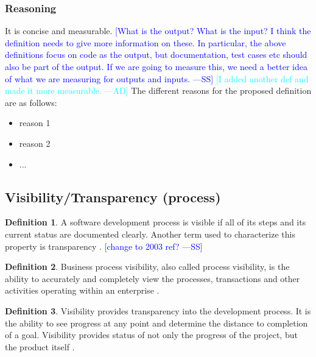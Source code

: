 \documentclass[letterpaper, cleveref]{lipics-v2019}
\newcommand{\authornote}[3]{\textcolor{#1}{[#3 ---#2]}}
\newcommand{\authornote}[3]{}
\newcommand{\wss}[1]{\authornote{blue}{SS}{#1}} %
\newcommand{\ad}[1]{\authornote{cyan}{AD}{#1}} %
\newcommand{\notdone}[1]{\textcolor{red}{#1}}
\theoremstyle{definition}
\newtheorem{defn}{Definition}
\begin{document}
\subsubsection*{Reasoning}

It is concise and measurable. \wss{What is the output?  What is the input? I
think the definition needs to give more information on these.  In particular,
the above definitions focus on code as the output, but documentation, test cases
etc should also be part of the output.  If we are going to measure this, we need
a better idea of what we are measuring for outputs and inputs.} \ad{I added
another def and made it more measurable.}   The different reasons for the
proposed definition are as follows:

\begin{itemize}
  \item reason 1
  \item reason 2
  \item ...
\end{itemize}


\subsection{Visibility/Transparency (process)} %

\begin{defn}
  \label{VisibilitySelected} A software development process is visible if
  all of its steps and its current status are documented clearly. Another
  term used to characterize this property is transparency
  \citep{ghezzi1991fundamentals}. \wss{change to 2003 ref?}
\end{defn}

\begin{defn}
  Business process visibility, also called process visibility, is the ability to
  accurately and completely view the processes, transactions and other
  activities operating within an enterprise \citep{Rouse2013}.
\end{defn}

\begin{defn}
  Visibility provides transparency into the development process. It is the
  ability to see progress at any point and determine the distance to completion
  of a goal.  Visibility provides status of not only the progress of the
  project, but the product itself \citep{GSA2019}.
\end{defn}
\end{document}
